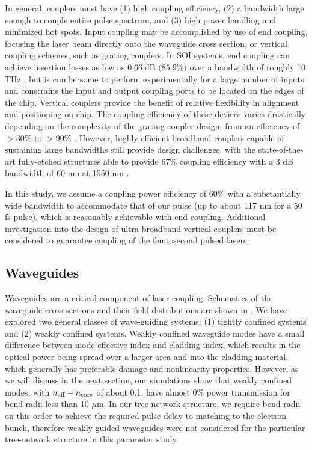 In general, couplers must have (1) high coupling efficiency, (2) a bandwidth large enough to couple entire pulse spectrum, and (3) high power handling and minimized hot spots.
Input coupling may be accomplished by use of end coupling, focusing the laser beam directly onto the waveguide cross section, or vertical coupling schemes, such as grating couplers.
In SOI systems, end coupling can achieve insertion losses as low as $0.66\;\text{dB (85.9\%)}$ over a bandwidth of roughly 10 THz \cite{pu2010ultra}, but is cumbersome to perform experimentally for a large number of inputs and constrains the input and output coupling ports to be located on the edges of the chip.
Vertical couplers provide the benefit of relative flexibility in alignment and positioning on chip.
The coupling efficiency of these devices varies drastically depending on the complexity of the grating coupler design, from an efficiency of $>30\%$ to $>90\%$ \cite{taillaert2006grating}.
However, highly efficient broadband couplers capable of sustaining large bandwidths still provide design challenges, with the state-of-the-art fully-etched structures able to provide $67\%$ coupling efficiency with a 3 dB bandwidth of 60 nm at 1550 nm \cite{ding2013ultrahigh}.

In this study, we assume a coupling power efficiency of $60\%$ with a substantially wide bandwidth to accommodate that of our pulse (up to about 117 nm for a 50 fs pulse), which is reasonably achievable with end coupling.
Additional investigation into the design of ultra-broadband vertical couplers must be considered to guarantee coupling of the femtosecond pulsed lasers.

\subsection{Waveguides}
Waveguides are a critical component of laser coupling.
Schematics of the waveguide cross-sections and their field distributions are shown in .
We have explored two general classes of wave-guiding systems: (1) tightly confined systems and (2) weakly confined systems.
Weakly confined waveguide modes have a small difference between mode effective index and cladding index, which results in the optical power being spread over a larger area and into the cladding material, which generally has preferable damage and nonlinearity properties.
However, as we will discuss in the next section, our simulations show that weakly confined modes, with $n_{\rm{eff}} - n_{\rm{core}}$ of about 0.1, have almost 0$\%$ power transmission for bend radii less than 10 $\mu$m.
In our tree-network structure, we  require bend radii on this order to achieve the required pulse delay to matching to the electron bunch, therefore weakly guided waveguides were not considered for the particular tree-network structure in this parameter study.

